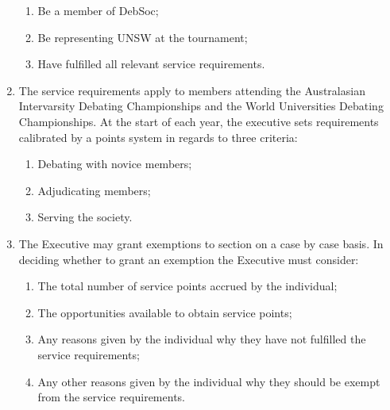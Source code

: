 \begin{enumerate}
  \begin{enumerate}
  \item Be a member of DebSoc;
  \item Be representing UNSW at the tournament;
  \item Have fulfilled all relevant service requirements. \label{service_req_exemption}
  \end{enumerate}
\item The service requirements apply to members attending the Australasian Intervarsity Debating Championships and the World Universities Debating Championships. At the start of each year, the executive sets requirements calibrated by a points system in regards to three criteria:
  \begin{enumerate}
  \item Debating with novice members;
  \item Adjudicating members;
  \item Serving the society.
  \end{enumerate}
\item The Executive may grant exemptions to section  on a case by case basis. In deciding whether to grant an exemption the Executive must consider:
  \begin{enumerate}
  \item The total number of service points accrued by the individual;
  \item The opportunities available to obtain service points;
  \item Any reasons given by the individual why they have not fulfilled the service requirements;
  \item Any other reasons given by the individual why they should be exempt from the service requirements.
  \end{enumerate}
\end{enumerate}
